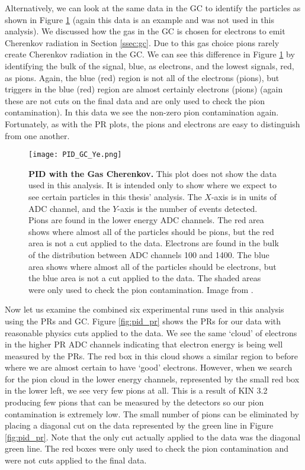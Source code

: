 Alternatively, we can look at the same data in the GC to identify the particles as shown in Figure \ref{fig:pid_gc_ye} (again this data is an example and was not used in this analysis). We discussed how the gas in the GC is chosen for electrons to emit Cherenkov radiation in Section \ref{ssec:gc}. Due to this gas choice pions rarely create Cherenkov radiation in the GC. We can see this difference in Figure \ref{fig:pid_gc_ye} by identifying the bulk of the signal, blue, as electrons, and the lowest signals, red, as pions. Again, the blue (red) region is not all of the electrons (pions), but triggers in the blue (red) region are almost certainly electrons (pions) (again these are not cuts on the final data and are only used to check the pion contamination). In this data we see the non-zero pion contamination again. Fortunately, as with the PR plots, the pions and electrons are easy to distinguish from one another.

\begin{figure}[!ht]
\begin{center}
\texttt{[image: PID\_GC\_Ye.png]}
\end{center}
\caption[PID with the Gas Cherenkov]{
{\bf{PID with the Gas Cherenkov.}} This plot does not show the data used in this analysis. It is intended only to show where we expect to see certain particles in this thesis' analysis. The $X$-axis is in units of ADC channel, and the $Y$-axis is the number of events detected. Pions are found in the lower energy ADC channels. The red area shows where almost all of the particles should be pions, but the red area is not a cut applied to the data. Electrons are found in the bulk of the distribution between ADC channels 100 and 1400. The blue area shows where almost all of the particles should be electrons, but the blue area is not a cut applied to the data. The shaded areas were only used to check the pion contamination. Image from \cite{Thesis:Ye}.}
\label{fig:pid_gc_ye}
\end{figure}

Now let us examine the combined six experimental runs used in this analysis using the PRs and GC. Figure \ref{fig:pid_pr} shows the PRs for our data with reasonable physics cuts applied to the data. We see the same `cloud' of electrons in the higher PR ADC channels indicating that electron energy is being well measured by the PRs. The red box in this cloud shows a similar region to before where we are almost certain to have `good' electrons. However, when we search for the pion cloud in the lower energy channels, represented by the small red box in the lower left, we see very few pions at all. This is a result of KIN 3.2 producing few pions that can be measured by the detectors so our pion contamination is extremely low. The small number of pions can be eliminated by placing a diagonal cut on the data represented by the green line in Figure \ref{fig:pid_pr}. Note that the only cut actually applied to the data was the diagonal green line. The red boxes were only used to check the pion contamination and were not cuts applied to the final data.


